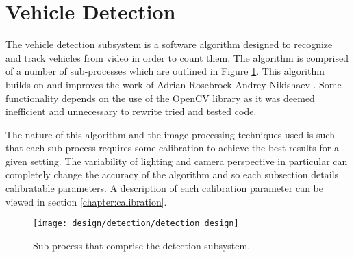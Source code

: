 \section{Vehicle Detection}

The vehicle detection subsystem is a software algorithm designed to recognize and track vehicles from video in order to count them. The algorithm is comprised of a number of sub-processes which are outlined in Figure \ref{fig:detection_design}. This algorithm builds on and improves the work of Adrian Rosebrock \cite{adrian_rosebrock_simple_object_tracking}\cite{adrian_rosebrock_vehicle_tracking} Andrey Nikishaev \cite{andrey_nikishaev_traffic_counting}. Some functionality depends on the use of the OpenCV library \cite{opencv} as it was deemed inefficient and unnecessary to rewrite tried and tested code. 

The nature of this algorithm and the image processing techniques used is such that each sub-process requires some calibration to achieve the best results for a given setting. The variability of lighting and camera perspective in particular can completely change the accuracy of the algorithm and so each subsection details calibratable parameters. A description of each calibration parameter can be viewed in section \ref{chapter:calibration}.

\begin{figure}[H]
    \texttt{[image: design/detection/detection\_design]}
    \caption{Sub-process that comprise the detection subsystem.}
    \label{fig:detection_design}
\end{figure}





